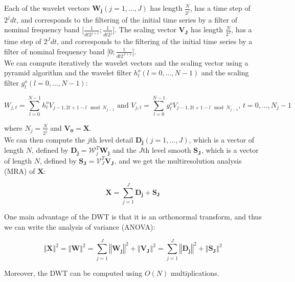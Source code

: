 \documentclass[main.tex]{subfiles}
\begin{document}
Each of the wavelet vectors $\bm{W_j} \left( j = 1 , ... , J \right)$ has length $\frac{N}{2^j}$, has a time step of $2^j dt$, and corresponds to the filtering of the initial time series by a filter of nominal frequency band $\lbrack \frac{1}{dt 2^{j + 1}} ; \frac{1}{dt 2^j} \rbrack$. The scaling vector $\bm{V_J}$ has length $\frac{N}{2^J}$, has a time step of $2^J dt$, and corresponds to the filtering of the initial time series by a filter of nominal frequency band $\lbrack 0 ; \frac{1}{dt 2^{J + 1}} \rbrack$. \\

We can compute iteratively the wavelet vectors and the scaling vector using a pyramid algorithm and the wavelet filter $h_l^o \left( l = 0 , ... , N - 1 \right)$ and the scaling filter $g_l^o \left( l = 0 , ... , N - 1 \right)$:

\begin{equation}
W_{j , t} = \sum_{l = 0}^{N - 1} h_l^o V_{j - 1 , 2 t + 1 - l \mod N_{j - 1}} \text{ and } V_{j , t} = \sum_{l = 0}^{N - 1} g_l^o V_{j - 1 , 2 t + 1 - l \mod N_{j - 1}} \text{, } t = 0 , ... , N_j - 1
\end{equation}

where $N_j = \frac{N}{2^j}$ and $\bm{V_0} = \bm{X}$. \\

We can then compute the $j$th level detail $\bm{D_j} \left( j = 1 , ... , J \right)$, which is a vector of length $N$, defined by $\bm{D_j} = \mathcal{W}_j^T \bm{W_j}$ and the $J$th level smooth $\bm{S_J}$, which is a vector of length $N$, defined by $\bm{S_J} = \mathcal{V}_J^T \bm{V_J}$, and we get the multiresolution analysis (MRA) of $\bm{X}$:

\begin{equation}
\bm{X} = \sum_{j = 1}^{J} \bm{D_j} + \bm{S_J}
\end{equation}

One main advantage of the DWT is that it is an orthonormal transform, and thus we can write the analysis of variance (ANOVA):

\begin{equation}
\left\Vert \bm{X} \right\Vert ^2 = \left\Vert \bm{W} \right\Vert ^2 = \sum_{j = 1}^{J} \left\Vert \bm{W_j} \right\Vert ^2 + \left\Vert \bm{V_J} \right\Vert ^2 = \sum_{j = 1}^{J} \left\Vert \bm{D_j} \right\Vert ^2 + \left\Vert \bm{S_J} \right\Vert ^2
\end{equation}

Moreover, the DWT can be computed using $O \left( N \right)$ multiplications. \\
\end{document}
